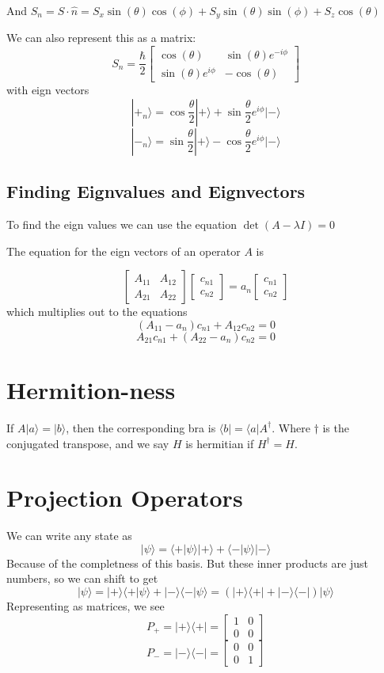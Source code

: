 \documentclass{homework}
\newcommand{\m}[1]{\begin{bmatrix} #1 \end{bmatrix}}
\newcommand{\ket}[1]{| #1 \rangle}
\newcommand{\bra}[1]{ \langle #1 |}
\begin{document}
And $S_n = S \cdot \hat{n} = S_x\sin(\theta)\cos(\phi)+ S_y\sin(\theta)\sin(\phi) + S_z\cos(\theta)$

We can also represent this as a matrix:
\[S_n  = \frac{\hbar}{2}\m{\cos(\theta) & \sin(\theta)e^{-i\phi} \\\sin(\theta)e^{i\phi} & -\cos(\theta)}\]
with eign vectors
\[\ket{+_n} = \cos \frac{\theta}{2}\ket{+} + \sin \frac{\theta}{2}e^{i\phi}\ket{-}\]
\[\ket{-_n} = \sin \frac{\theta}{2}\ket{+} - \cos \frac{\theta}{2}e^{i\phi}\ket{-}\]


\subsection{Finding Eignvalues and Eignvectors}

To find the eign values we can use the equation $\det(A - \lambda I) = 0$

The equation for the eign vectors of an operator $A$ is 

\[\m{A_{11} & A_{12} \\ A_{21} & A_{22}}\m{c_{n1} \\ c_{n2}} = a_n \m{c_{n1} \\ c_{n2}}\]
which multiplies out to the equations
\[(A_{11} - a_n)c_{n1} + A_{12}c_{n2} = 0\]
\[A_{21}c_{n1}+ (A_{22}- a_n)c_{n2} = 0\]


\section{Hermition-ness}

If $A \ket{a} = \ket{b}$, then the corresponding bra is $\bra{b} = \bra{a}A^{\dag}$. Where $\dag$ is the conjugated transpose, and we say $H$ is hermitian if $H^{\dag} = H$.


\section{Projection Operators}

We can write any state as 
\[\ket{\psi} = \bra{+}\psi \rangle \ket{+} + \bra{-}\psi \rangle \ket{-} \]
Because of the completness of this basis. But these inner products are just numbers, so we can shift to get
\[\ket{\psi} = \ket{+}\bra{+}\psi \rangle  +  \ket{-} \bra{-}\psi \rangle = (\ket{+}\bra{+}  +  \ket{-} \bra{-}) \ket{\psi}\]
Representing as matrices, we see
\[P_{+} =\ket{+}\bra{+}  = \m{1 & 0 \\ 0 & 0 }\]
\[P_{-} =\ket{-}\bra{-}  = \m{0 & 0 \\ 0 & 1 }\]
\end{document}
